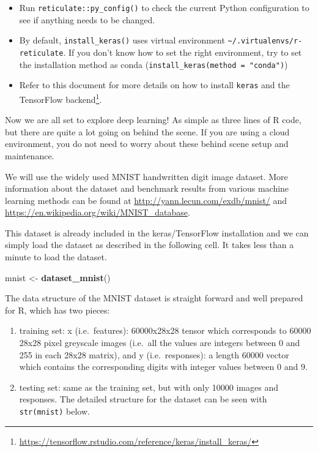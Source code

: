 \documentclass[12pt,]{krantz}
\makeatletter
\newenvironment{Shaded}{\begin{snugshade}}{\end{snugshade}}
\newcommand{\KeywordTok}[1]{\textcolor[rgb]{0.27,0.27,0.27}{\textbf{#1}}}
\newcommand{\NormalTok}[1]{#1}
\newcommand{\StringTok}[1]{\textcolor[rgb]{0.5,0.5,0.5}{#1}}
\providecommand{\tightlist}{%
  \setlength{\itemsep}{0pt}\setlength{\parskip}{0pt}}
\renewcommand{\href}[2]{#2\footnote{\url{#1}}}
\newenvironment{kframe}{%
\medskip{}
\setlength{\fboxsep}{.8em}
 \def\at@end@of@kframe{}%
 \ifinner\ifhmode%
  \def\at@end@of@kframe{\end{minipage}}%
  \begin{minipage}{\columnwidth}%
 \fi\fi%
 \def\FrameCommand##1{\hskip\@totalleftmargin \hskip-\fboxsep
 \colorbox{shadecolor}{##1}\hskip-\fboxsep
     \hskip-\linewidth \hskip-\@totalleftmargin \hskip\columnwidth}%
 \MakeFramed {\advance\hsize-\width
   \@totalleftmargin\z@ \linewidth\hsize
   \@setminipage}}%
 {\par\unskip\endMakeFramed%
 \at@end@of@kframe}
\renewenvironment{Shaded}{\begin{kframe}}{\end{kframe}}
\makeatother
\begin{document}
\begin{itemize}
\tightlist
\item
  Run \texttt{reticulate::py\_config()} to check the current Python configuration to see if anything needs to be changed.
\item
  By default, \texttt{install\_keras()} uses virtual environment \texttt{\textasciitilde{}/.virtualenvs/r-reticulate}. If you don't know how to set the right environment, try to set the installation method as conda (\texttt{install\_keras(method\ =\ "conda")})
\item
  Refer to this document for more details on how to \href{https://tensorflow.rstudio.com/reference/keras/install_keras/}{install \texttt{keras} and the TensorFlow backend}.
\end{itemize}

Now we are all set to explore deep learning! As simple as three lines of R code, but there are quite a lot going on behind the scene. If you are using a cloud environment, you do not need to worry about these behind scene setup and maintenance.

We will use the widely used MNIST handwritten digit image dataset. More information about the dataset and benchmark results from various machine learning methods can be found at \url{http://yann.lecun.com/exdb/mnist/} and \url{https://en.wikipedia.org/wiki/MNIST_database}.

This dataset is already included in the keras/TensorFlow installation and we can simply load the dataset as described in the following cell. It takes less than a minute to load the dataset.

\begin{Shaded}
\begin{Highlighting}[]
\NormalTok{mnist <-}\StringTok{ }\KeywordTok{dataset_mnist}\NormalTok{()}
\end{Highlighting}
\end{Shaded}

The data structure of the MNIST dataset is straight forward and well prepared for R, which has two pieces:

\begin{enumerate}
\def\labelenumi{(\arabic{enumi})}
\item
  training set: x (i.e.~features): 60000x28x28 tensor which corresponds to 60000 28x28 pixel greyscale images (i.e.~all the values are integers between 0 and 255 in each 28x28 matrix), and y (i.e.~responses): a length 60000 vector which contains the corresponding digits with integer values between 0 and 9.
\item
  testing set: same as the training set, but with only 10000 images and responses. The detailed structure for the dataset can be seen with \texttt{str(mnist)} below.
\end{enumerate}
\end{document}
